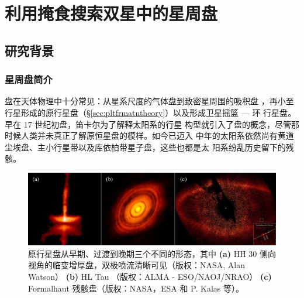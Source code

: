 \chapter{利用掩食搜索双星中的星周盘} \label{chapter:form_evo}

\section{研究背景} \label{sec:diskbackground}

\subsection{星周盘简介} \label{sec:diskintro}

盘在天体物理中十分常见：从星系尺度的气体盘\cite{Binney1987,Gilmore1989}到致密星周围的吸积盘
\cite{Pringle1981}，再小至行星形成的原行星盘（\S \ref{sec:pltfrmatntheory}）以及形成卫星摇篮 --- 环
行星盘\cite{Smith1981,Latter2017,Mosqueira2003}。早在 17 世纪初盘，笛卡尔为了解释太阳系的行星
构型就引入了盘的概念，尽管那时候人类并未真正了解原恒星盘的模样\cite{Kawabe1993}。如今已迈入
中年的太阳系依然尚有黄道尘埃盘\cite{Dermott1994}、主小行星带以及库依柏带星子盘，这些也都是太
阳系纷乱历史留下的残骸\cite{Dohnanyi1969}。


\begin{figure}[b]
\centering
\includegraphics[width=1.0\textwidth]{figures/chapter3/f2_obsdisc.jpg}
\caption{原行星盘从早期、过渡到晚期三个不同的形态，其中 \textbf{(a)} HH 30 侧向视角的临变增厚盘，双极喷流清晰可见（版权：NASA, Alan Watson） \textbf{(b)} HL Tau （版权：ALMA - ESO/NAOJ/NRAO） \textbf{(c)} Formalhaut 残骸盘（版权：NASA，ESA 和 P. Kalas 等）。}
\label{fig:obsdisc}
\end{figure}

